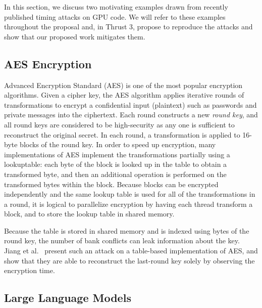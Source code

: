 \label{sec:motivating}
In this section, we discuss two motivating examples drawn from recently
published timing attacks on GPU code.
%
We will refer to these examples throughout the proposal and, in Thrust 3,
propose to reproduce the attacks and show that our proposed work mitigates
them.

\subsection{AES Encryption}
Advanced Encryption Standard (AES) is one of the most popular encryption algorithms.
%
Given a cipher key, the AES algorithm applies iterative rounds of transformations  to encrypt a confidential input (plaintext) such as passwords and private messages into the ciphertext.
%
Each round constructs a new {\em round key}, and all round keys are considered
to be high-security as any one is sufficient to reconstruct the original
secret.
%
In each round, a transformation is applied to 16-byte blocks of the round key.
%
In order to speed up encryption, many implementations of AES implement the
transformations partially using a lookuptable: each byte of the block is
looked up in the table to obtain a transformed byte, and then an additional
operation is performed on the transformed bytes within the block.
%
Because blocks can be encrypted independently and the same lookup table is used
for all of the transformations in a round, it is logical to parallelize
encryption by having each thread transform a block, and to store the lookup
table in shared memory.

Because the table is stored in shared memory and is indexed using bytes of the
round key, the number of bank conflicts can leak information about the key.
%
Jiang et al.~\cite{AESattack} present such an attack on a table-based
implementation of AES, and show that they are able to reconstruct the
last-round key solely by observing the encryption time.

\subsection{Large Language Models}
